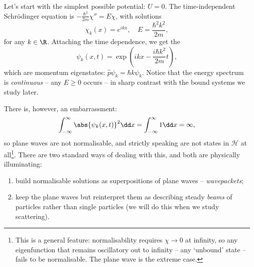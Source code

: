 Let's start with the simplest possible potential: $U = 0$. The time-independent Schr\"odinger equation is $-\frac{\hbar^2}{2m}\chi'' = E \chi$, with solutions
$$
\chi_k(x) = e^{ikx}, \quad E = \frac{\hbar^2 k^2}{2m},
$$
for any $k \in \R$. Attaching the time dependence, we get the 
$$
\psi_k(x, t) = \exp\left(i k x - \frac{i\hbar k^2}{2m} t\right),
$$
which are momentum eigenstates: $\hat{p} \psi_k = \hbar k \psi_k$. Notice that the energy spectrum is \emph{continuous} -- any $E \geq 0$ occurs -- in sharp contrast with the bound systems we study later.

There is, however, an embarrassment:
$$
\int_{-\infty}^{\infty} \abs{\psi_k(x,t)}^2 \dd x = \int_{-\infty}^{\infty} 1 \dd x = \infty,
$$
so plane waves are not normalisable, and strictly speaking are not states in $\mathcal{H}$ at all\footnote{This is a general feature: normalisability requires $\chi \rightarrow 0$ at infinity, so any eigenfunction that remains oscillatory out to infinity -- any `unbound' state -- fails to be normalisable. The plane wave is the extreme case.}. There are two standard ways of dealing with this, and both are physically illuminating:
\begin{enumerate}[label=(\roman*)]
    \item build normalisable solutions as superpositions of plane waves -- \emph{wavepackets};
    \item keep the plane waves but reinterpret them as describing steady \emph{beams} of particles rather than single particles (we will do this when we study scattering).
\end{enumerate}

